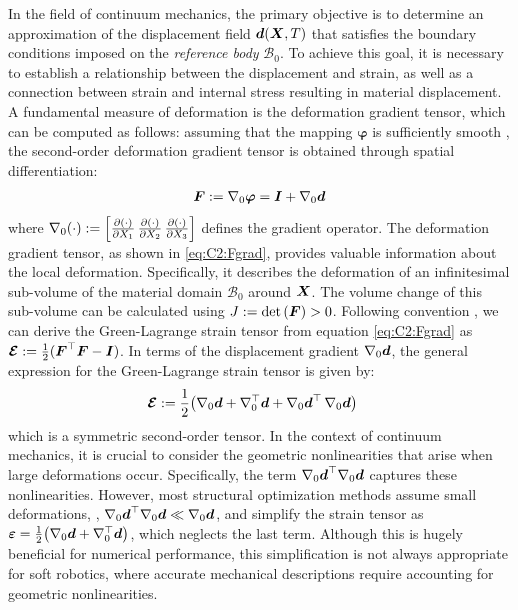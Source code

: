 In the field of continuum mechanics, the primary objective is to determine an approximation of the displacement field ${\boldsymbol{d}}({\boldsymbol{X}},T)$ that satisfies the boundary conditions imposed on the \textit{reference body} $\mathcal{B}_0$. To achieve this goal, it is necessary to establish a relationship between the displacement and strain, as well as a connection between strain and internal stress resulting in material displacement. A fundamental measure of deformation is the deformation gradient tensor, which can be computed as follows: assuming that the mapping $\boldsymbol{\varphi}$ is sufficiently smooth \cite{Kim2018,Holzapfel2002}, the second-order deformation gradient tensor is obtained through spatial differentiation:
%
\begin{align}
\boldsymbol{F} :=  \nabla_0 \boldsymbol{\varphi} = \boldsymbol{I} + \nabla_0 {\boldsymbol{d}}
\label{eq:C2:Fgrad}
\end{align}
%
where $\nabla_0 (\cdot):= \left[\frac{\partial (\cdot)}{\partial X_1}\, \frac{\partial (\cdot)}{\partial X_2}\, \frac{\partial (\cdot)}{\partial X_3}\right]$ defines the gradient operator. The deformation gradient tensor, as shown in \eqref{eq:C2:Fgrad}, provides valuable information about the local deformation. Specifically, it describes the deformation of an infinitesimal sub-volume of the material domain $\mathcal{B}_0$ around ${\boldsymbol{X}}$. The volume change of this sub-volume can be calculated using $J := \textnormal{det}\left( {{\boldsymbol{F}}} \right) > 0$. Following convention \cite{Kim2018,Holzapfel2002}, we can derive the Green-Lagrange strain tensor from equation \eqref{eq:C2:Fgrad} as ${\boldsymbol{\mathcal{E}}} : = \frac{1}{2}({\boldsymbol{F}}^\top {\boldsymbol{F}} - \boldsymbol{I})$. In terms of the displacement gradient $\nabla_{0} {\boldsymbol{d}}$, the general expression for the Green-Lagrange strain tensor is given by:
%
\begin{align}
\boldsymbol{\mathcal{E}} & := \frac{1}{2}\big( \nabla_0 {\boldsymbol{d}}  +\nabla_0^\top {\boldsymbol{d}}  + \nabla_0 {\boldsymbol{d}}^\top \, \nabla_0 {\boldsymbol{d}} \big)
\label{eq:E_tens}
\end{align}
%
which is a symmetric second-order tensor. In the context of continuum mechanics, it is crucial to consider the geometric nonlinearities that arise when large deformations occur. Specifically, the term $\nabla_0 {\boldsymbol{d}}^\top \nabla_0 {\boldsymbol{d}}$ captures these nonlinearities. However, most structural optimization methods assume small deformations, \ie, $\nabla_0 {\boldsymbol{d}}^\top \nabla_0 {\boldsymbol{d}} \ll \nabla_0 {\boldsymbol{d}}$, and simplify the strain tensor as $\boldsymbol{\varepsilon} = \tfrac{1}{2}\big( \nabla_0 {\boldsymbol{d}} + \nabla_0^\top {\boldsymbol{d}} \big)$, which neglects the last term. Although this is hugely beneficial for numerical performance, this simplification is not always appropriate for soft robotics, where accurate mechanical descriptions require accounting for geometric nonlinearities.

